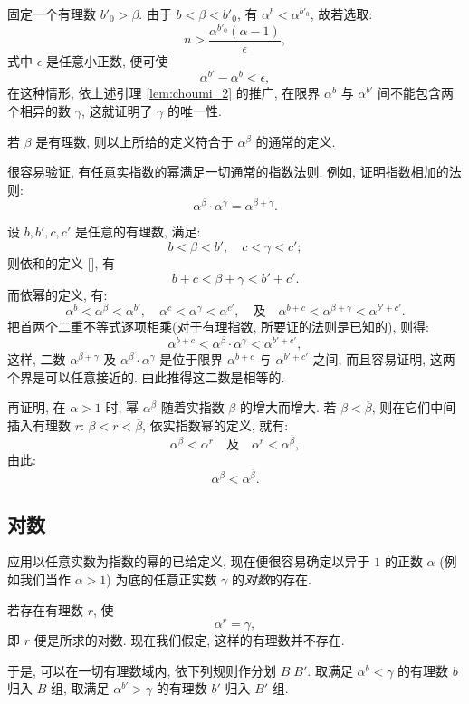 固定一个有理数 $b'_0>\beta$. 由于 $b<\beta<b'_0$, 有 $\alpha^b<\alpha^{b'_0}$, 故若选取:
$$ n > \dfrac{\alpha^{b'_0}(\alpha - 1)}{\epsilon}, $$
式中 $\epsilon$ 是任意小正数, 便可使
$$ \alpha^{b'} - \alpha^b < \epsilon, $$
在这种情形, 依上述引理 \ref{lem:choumi_2} 的推广, 在限界 $\alpha^b$ 与 $\alpha^{b'}$ 间不能包含两个相异的数 $\gamma$,
这就证明了 $\gamma$ 的唯一性.

若 $\beta$ 是有理数, 则以上所给的定义符合于 $\alpha^\beta$ 的通常的定义.

很容易验证, 有任意实指数的幂满足一切通常的指数法则.
例如, 证明指数相加的法则:
$$ \alpha^\beta \cdot \alpha^\gamma = \alpha^{\beta+\gamma}. $$

设 $b, b', c, c'$ 是任意的有理数, 满足:
$$ b < \beta < b', \quad c < \gamma < c'; $$
则依和的定义 [], 有
$$ b + c < \beta + \gamma < b' + c'. $$
而依幂的定义, 有:
$$ \alpha^b < \alpha^\beta < \alpha^{b'}, \quad \alpha^c < \alpha^\gamma < \alpha^{c'}, \quad \text{及} \quad \alpha^{b+c} < \alpha^{\beta+\gamma} < \alpha^{b'+c'}. $$
把首两个二重不等式逐项相乘(对于有理指数, 所要证的法则是已知的), 则得:
$$ \alpha^{b+c} < \alpha^\beta \cdot \alpha^\gamma < \alpha^{b'+c'}, $$
这样, 二数 $\alpha^{\beta+\gamma}$ 及 $\alpha^\beta \cdot \alpha^\gamma$ 是位于限界 $\alpha^{b+c}$ 与 $\alpha^{b'+c'}$ 之间,
而且容易证明, 这两个界是可以任意接近的.
由此推得这二数是相等的.

再证明, 在 $\alpha > 1$ 时, 幂 $\alpha^\beta$ 随着实指数 $\beta$ 的增大而增大.
若 $\beta < \overline{\beta}$, 则在它们中间插入有理数 $r$: $\beta < r < \overline{\beta}$,
依实指数幂的定义, 就有:
$$ \alpha^\beta < \alpha^r \quad \text{及} \quad \alpha^r < \alpha^{\overline{\beta}}, $$
由此:
$$ \alpha^\beta < \alpha^{\overline{\beta}}. $$

\subsection{对数}\label{subsec:20}

应用以任意实数为指数的幂的已给定义, 现在便很容易确定以异于 $1$ 的正数 $\alpha$ (例如我们当作 $\alpha > 1$) 为底的任意正实数 $\gamma$ 的\emph{对数}的存在.

若存在有理数 $r$, 使
$$ \alpha^r = \gamma, $$
即 $r$ 便是所求的对数.
现在我们假定, 这样的有理数并不存在.

于是, 可以在一切有理数域内, 依下列规则作分划 $B|B'$.
取满足 $\alpha^b < \gamma$ 的有理数 $b$ 归入 $B$ 组,
取满足 $\alpha^{b'} > \gamma$ 的有理数 $b'$ 归入 $B'$ 组.

